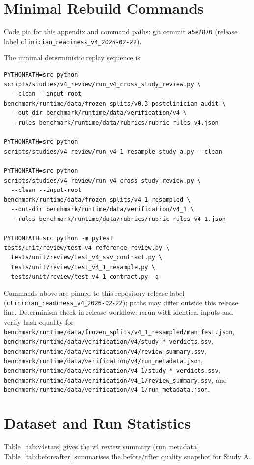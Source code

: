 \documentclass[11pt]{article}
\begin{document}
\section{Minimal Rebuild Commands}
Code pin for this appendix and command paths: git commit \texttt{a5e2870} (release label \texttt{clinician\_readiness\_v4\_2026-02-22}).

The minimal deterministic replay sequence is:
\begin{lstlisting}[language={}]
PYTHONPATH=src python scripts/studies/v4_review/run_v4_cross_study_review.py \
  --clean --input-root benchmark/runtime/data/frozen_splits/v0.3_postclinician_audit \
  --out-dir benchmark/runtime/data/verification/v4 \
  --rules benchmark/runtime/data/rubrics/rubric_rules_v4.json

PYTHONPATH=src python scripts/studies/v4_review/run_v4_1_resample_study_a.py --clean

PYTHONPATH=src python scripts/studies/v4_review/run_v4_cross_study_review.py \
  --clean --input-root benchmark/runtime/data/frozen_splits/v4_1_resampled \
  --out-dir benchmark/runtime/data/verification/v4_1 \
  --rules benchmark/runtime/data/rubrics/rubric_rules_v4_1.json

PYTHONPATH=src python -m pytest tests/unit/review/test_v4_reference_review.py \
  tests/unit/review/test_v4_ssv_contract.py \
  tests/unit/review/test_v4_1_resample.py \
  tests/unit/review/test_v4_1_contract.py -q
\end{lstlisting}
Commands above are pinned to this repository release label (\texttt{clinician\_readiness\_v4\_2026-02-22}); paths may differ outside this release line.
Determinism check in release workflow: rerun with identical inputs and verify hash-equality for
\texttt{benchmark/runtime/data/frozen\_splits/v4\_1\_resampled/manifest.json},
\texttt{benchmark/runtime/data/verification/v4/study\_*\_verdicts.ssv},
\texttt{benchmark/runtime/data/verification/v4/review\_summary.ssv},
\texttt{benchmark/runtime/data/verification/v4/run\_metadata.json},
\texttt{benchmark/runtime/data/verification/v4\_1/study\_*\_verdicts.ssv},
\texttt{benchmark/runtime/data/verification/v4\_1/review\_summary.ssv}, and
\texttt{benchmark/runtime/data/verification/v4\_1/run\_metadata.json}.

\section{Dataset and Run Statistics}
Table~\ref{tab:v4stats} gives the v4 review summary (run metadata). Table~\ref{tab:beforeafter} summarises the before/after quality snapshot for Study A.
\end{document}
